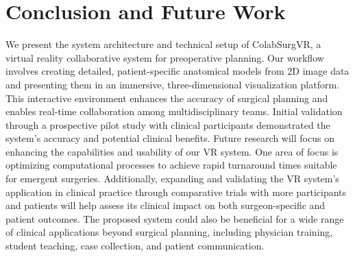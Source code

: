 \documentclass{bmcart}
\begin{document}
\section{Conclusion and Future Work}
We present the system architecture and technical setup of ColabSurgVR, a virtual reality collaborative system for preoperative planning. Our workflow involves creating detailed, patient-specific anatomical models from 2D image data and presenting them in an immersive, three-dimensional visualization platform. This interactive environment enhances the accuracy of surgical planning and enables real-time collaboration among multidisciplinary teams. Initial validation through a prospective pilot study with clinical participants demonstrated the system's accuracy and potential clinical benefits.
Future research will focus on enhancing the capabilities and usability of our VR system. One area of focus is optimizing computational processes to achieve rapid turnaround times suitable for emergent surgeries. Additionally, expanding and validating the VR system's application in clinical practice through comparative trials with more participants and patients will help assess its clinical impact on both surgeon-specific and patient outcomes. The proposed system could also be beneficial for a wide range of clinical applications beyond surgical planning, including physician training, student teaching, case collection, and patient communication.



\end{document}
